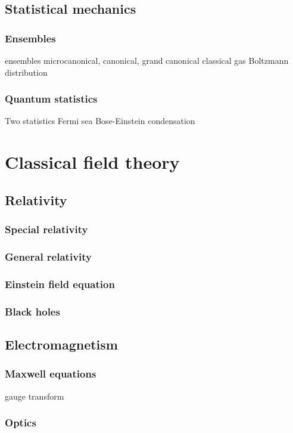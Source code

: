 \documentclass{../../large}
\begin{document}
\chapter{Statistical mechanics}
\section{Ensembles}
ensembles
microcanonical, canonical, grand canonical
classical gas
Boltzmann distribution
\section{Quantum statistics}
Two statistics
Fermi sea
Bose-Einstein condensation






\part{Classical field theory}

\chapter{Relativity}
\section{Special relativity}
\section{General relativity}
\section{Einstein field equation}
\section{Black holes}

\chapter{Electromagnetism}
\section{Maxwell equations}
gauge transform
\section{Optics}
\end{document}
